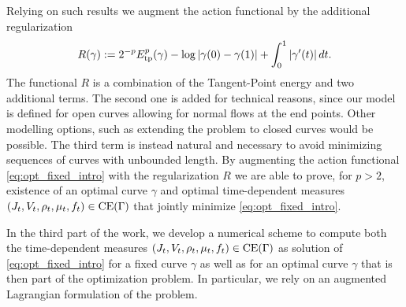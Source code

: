 \documentclass{article}
\begin{document}
Relying on such results we augment the action functional by the additional regularization
\begin{align}\label{eq:}
    R (\gamma) := 2^{-p}E^p_{\rm tp}(\gamma) -\log|\gamma(0) - \gamma(1)| + \int_0^{1} |\gamma'(t)| \, dt.
\end{align}
The functional $R$ is a combination of the Tangent-Point energy and two additional terms. The second one is added for technical reasons, since our model is defined for open curves allowing for normal flows at the end points. Other modelling options, such as extending the problem to closed curves would be possible. The third term is instead natural and necessary to avoid minimizing sequences of curves with unbounded length. By augmenting the action functional \eqref{eq:opt_fixed_intro} with the regularization $R$ we are able to prove, for $p>2$, existence of an optimal curve $\gamma$ and optimal time-dependent measures $(J_t, V_t, \rho_t, \mu_t, f_t) \in {\rm CE}(\Gamma)$ that jointly minimize \eqref{eq:opt_fixed_intro}.

In the third part of the work, we develop a numerical scheme to compute both the time-dependent measures $(J_t, V_t, \rho_t, \mu_t, f_t) \in {\rm CE}(\Gamma)$ as solution of \eqref{eq:opt_fixed_intro} for a fixed curve $\gamma$ as well as for an optimal curve $\gamma$ that is then part of the optimization problem. In particular, we rely on an augmented Lagrangian formulation of the problem. 
\end{document}
